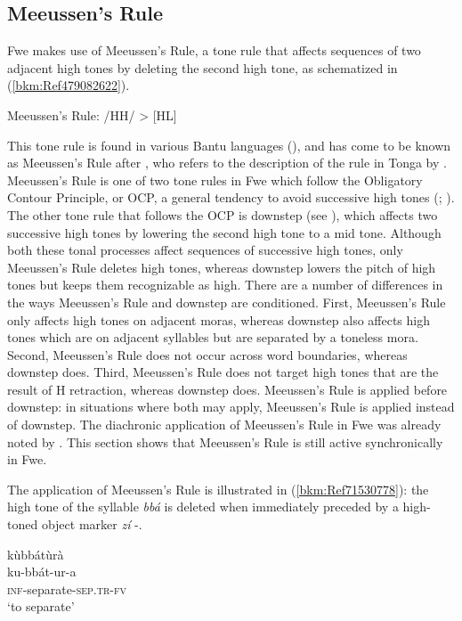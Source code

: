 \subsection{Meeussen’s Rule}
\label{bkm:Ref440987952}\hypertarget{Toc75352618}{}
Fwe makes use of Meeussen’s Rule, a tone rule that affects sequences of two adjacent high tones by deleting the second high tone, as schematized in (\ref{bkm:Ref479082622}).

\ea
\label{bkm:Ref479082622}
  Meeussen’s Rule: /HH/ > [HL]
\z

This tone rule is found in various Bantu languages (\citealt{KisseberthOdden2003}), and has come to be known as Meeussen’s Rule after {\citet{Goldsmith1984}}, who refers to the descrip\-tion of the rule in Tonga by \citet{Meeussen1963}. Meeussen’s Rule is one of two tone rules in Fwe which follow the Oblig\-atory Contour Principle, or OCP, a general tendency to avoid successive high tones (\citealt{KisseberthOdden2003}; \citealt{OddenMarlo2019}). The other tone rule that follows the OCP is downstep (see ), which affects two successive high tones by lowering the second high tone to a mid tone. Although both these tonal processes affect sequences of successive high tones, only Meeussen’s Rule deletes high tones, whereas downstep lowers the pitch of high tones but keeps them recog\-nizable as high. There are a number of differences in the ways Meeussen’s Rule and downstep are conditioned. First, Meeussen’s Rule only affects high tones on adjacent moras, whereas downstep also affects high tones which are on adjacent syllables but are separated by a toneless mora. Second, Meeussen’s Rule does not occur across word boundaries, whereas downstep does. Third, Meeussen’s Rule does not target high tones that are the result of H retraction, whereas downstep does. Meeussen’s Rule is applied before downstep: in situations where both may apply, Meeussen’s Rule is applied instead of downstep. The diachronic application of Meeussen’s Rule in Fwe was already noted by {\citet[122]{Bostoen2009}}. This section shows that Meeussen’s Rule is still active synchronically in Fwe.

The application of Meeussen’s Rule is illustrated in (\ref{bkm:Ref71530778}): the high tone of the syllable \textit{bbá{} } is deleted when immediately preceded by a high-toned object marker \textit{zí{} \-}-.

\ea
\label{bkm:Ref71530778}
\ea
\glll kùbbátùrà\\
ku-bbát-ur-a\\
\textsc{inf}-separate-\textsc{sep}.\textsc{tr}-\textsc{fv}\\
\glt ‘to separate’

